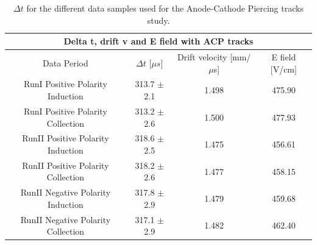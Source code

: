 \begin{center}
\begin{table}[htb]
  \begin{center}
    \begin{tabular}{|c|c|c|c|}
      \multicolumn{4}{c}{\textbf{Delta t, drift v and E field with ACP tracks}} \\
      \hline \hline
       Data Period  & $\Delta t$ [$\mu s$] & Drift velocity [mm/$\mu$s] & E field [V/cm] \\
       \hline
       RunI Positive Polarity Induction & 313.7 $\pm$ 2.1  & 1.498 & 475.90\\
       \hline
       RunI Positive Polarity Collection & 313.2 $\pm$ 2.6 & 1.500 & 477.93 \\
       \hline
       RunII Positive Polarity Induction &  318.6 $\pm$ 2.5& 1.475 & 456.61 \\
       \hline
       RunII Positive Polarity Collection & 318.2 $\pm$ 2.6& 1.477 & 458.15 \\
       \hline
       RunII Negative Polarity Induction &  317.8 $\pm$ 2.9& 1.479 & 459.68 \\
       \hline
       RunII Negative Polarity Collection & 317.1 $\pm$ 2.9 & 1.482 & 462.40 \\
       \hline
       \end{tabular}
    \caption{$\Delta t$ for the different data samples used for the Anode-Cathode Piercing tracks study. }
    \label{tab:deltaTACP}
    \end{center}
\end{table}
\end{center}


